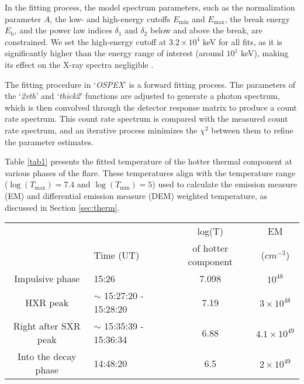 In the fitting process, the model spectrum parameters, such as the normalization parameter \( A \), the low- and high-energy cutoffs \( E_{\text{min}} \) and \( E_{\text{max}} \), the break energy \( E_{\text{b}} \), and the power law indices \( \delta_{1} \) and \( \delta_{2} \) below and above the break, are constrained. We set the high-energy cutoff at \( 3.2 \times 10^{4} \) keV for all fits, as it is significantly higher than the energy range of interest (around \( 10^{1} \) keV), making its effect on the X-ray spectra negligible \citep{emslie12}.

The fitting procedure in `\textit{OSPEX}' is a forward fitting process. The parameters of the `\textit{2vth}' and `\textit{thick2}' functions are adjusted to generate a photon spectrum, which is then convolved through the detector response matrix to produce a count rate spectrum. This count rate spectrum is compared with the measured count rate spectrum, and an iterative process minimizes the \( \chi^{2} \) between them to refine the parameter estimates.

Table \ref{tab1} presents the fitted temperature of the hotter thermal component at various phases of the flare. These temperatures align with the temperature range (\( \log(T_{\text{max}}) = 7.4 \) and \( \log(T_{\text{min}}) = 5 \)) used to calculate the emission measure (EM) and differential emission measure (DEM) weighted temperature, as discussed in Section \ref{sec:therm}.

\begin{table*}[ht!]
    \centering
    \begin{tabular}{|cl||c|c|}
    \hline
         &  & log(T) & EM \\ 
         & \hspace{-1cm}Time (UT) & of hotter component & ($cm^{-3}$) \\
    \hline
        Impulsive phase & \hspace{1cm}15:26 & 7.098 & $10^{48}$\\
        HXR peak & $\sim$ 15:27:20 - 15:28:20 & 7.19 & $3\times 10^{48}$\\
        Right after SXR peak & $\sim$ 15:35:39 - 15:36:34 & 6.88 & $4.1\times 10^{49}$\\
        Into the decay phase & \hspace{0.9cm}14:48:20 & 6.5 & $2\times 10^{49}$\\
        \hline
    \end{tabular}
    \caption{Fitted temperature of the hotter component of the thermal plasma during various stages of the flare.}
    \label{tab1}
\end{table*}

